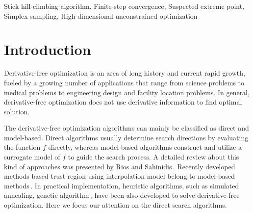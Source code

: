 \documentclass[final,1p,times]{elsarticle}
\begin{document}
\begin{frontmatter}

\begin{keyword}
Stick hill-climbing algorithm, Finite-step convergence,
Suspected extreme point, Simplex sampling, 
High-dimensional unconstrained optimization
\end{keyword}

\end{frontmatter}


\section{Introduction}
\label{sec:intro}

Derivative-free optimization is an area of long history and
current rapid growth, fueled by a growing number of applications
that range from science problems to medical problems to
engineering design and facility location problems. 
In general, derivative-free optimization  does not use derivative
information to find optimal solution. 

The derivative-free optimization algorithms can mainly be
classified as direct and model-based.  Direct algorithms usually
determine search directions by evaluating the
function $f$ directly, whereas model-based algorithms construct
and utilize a surrogate model of $f$ to guide the search process.
A detailed review about this kind of approaches was presented by
Rios and Sahinidis\,\cite{rios2013derivative}.
Recently developed methods based trust-region using
interpolation model belong to model-based methods\,\cite{powell2000uobyqa,
powell2002trust, wu2009heuristic, zhang2014sobolev}. 
In practical implementation, heuristic algorithms, such as
simulated annealing, genetic algorithm\,\cite{michalewicz2004how}, 
have been also developed to solve derivative-free optimization.
Here we focus our attention on the direct search algorithms.
\end{document}

